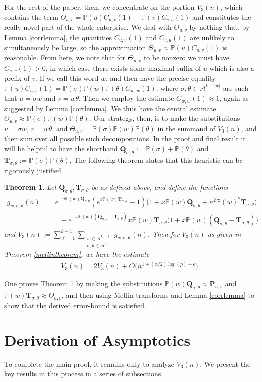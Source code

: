 \documentclass[proceedings]{aofa}
\newtheorem{theorem}{Theorem}
\newcommand{\Tst}{\textbf{T}_{\sigma,\theta}}
\newcommand{\gt}{g_{w,\sigma,\theta}}
\newcommand{\Puv}{\Ps_{u,v}}
\newcommand{\pro}{\mathbb{P}}
\newcommand{\bigo}[1]{O\big(#1\big)}
\newcommand{\A}{\mathcal{A}}
\newcommand{\Thetauv}{\Theta_{u,v}}
\newcommand{\Pu}{\pro(u)}
\newcommand{\Pv}{\pro(v)}
\newcommand{\stdO}{\bigo{n^{ 1+(\alpha/2)\log(p)+\epsilon}}}
\newcommand{\Cuv}{C_{u,v}}
\newcommand{\Cvu}{C_{v,u}}
\newcommand{\Ptheta}{\pro(\theta)}
\newcommand{\Psigma}{\pro(\sigma)}
\newcommand{\Pw}{\pro(w)}
\newcommand{\Qst}{\textbf{Q}_{\sigma,\theta}}
\newcommand{\Ps}{\textbf{P}}
\newcommand{\Vtt}{\widetilde{V}_{3}}
\begin{document}
For the rest of the paper, then, we concentrate on the portion $V_{3}(n)$, which contains the term $\Thetauv=
\Pu\Cuv(1)+\Pv\Cvu(1)$ and constitutes the really novel part of the whole enterprise. We deal with $\Thetauv$ by nothing that, by Lemma \ref{corrlemma}, the quantities $\Cuv(1)$ and $\Cvu(1)$ are unlikely
to simultaneously be large, so the approximation
$\Thetauv \approx \Pu\Cuv(1)$ is reasonable. From here, we note that for $\Thetauv$ to be nonzero we must have $\Cuv(1)>0$, in which case there exists some maximal suffix of $u$ which is also a
prefix of $v$. If we call this word $w$, and then have the precise
equality $\Pu\Cuv(1)=\Psigma \Pw \Ptheta C_{w,w}(1).$ where
$\sigma,\theta \in \A^{k-|w|}$ are such that $u=\sigma w$ and
$v=w\theta$. Then we employ the estimate $C_{w,w}(1) \approx 1$, again as suggested by Lemma \ref{corrlemma}. We thus have the central estimate
$\Thetauv \approx \Psigma \Pw \Ptheta$.
Our strategy, then, is to make the substitutions $u=\sigma w$,
$v=w\theta$, and $\Thetauv = \Psigma\Pw\Ptheta$ in the summand of $V_{3}(n)$, 
and then sum over all possible such decompositions. In the proof and final result it will be  helpful to have the shorthand 
$\Qst := \Psigma + \Ptheta$ and $\Tst := \Psigma\Ptheta$,
The following theorem states that this heuristic can be rigorously justified.
\begin{theorem}\label{thetatheorem}
Let $\Qst,\Tst$ be as defined above, and define the functions
\begin{align*}
\gt(n)&=e^{-n\Pw\Qst}(e^{x\Pw\Tst}-1)\big(1 + x\Pw\Qst + n^{2}\Pw^{2}\Tst)\\
&\qquad{} - e^{-x\Pw(\Qst-\Tst)}x\Pw\Tst\big(1+x\Pw(\Qst-\Tst)\big)
\end{align*}
and
$\Vtt(n):=\sum_{\ell=1}^{k-1}\sum_{\substack{w \in \A^{k-\ell} \\ \sigma,\theta \in \A^{\ell}}}\gt(n)$.
Then for $V_{3}(n)$ as given in Theorem \ref{mellintheorem}, we have the estimate
\begin{align*}
V_{3}(n) = 2\Vtt(n) + \stdO.
\end{align*}
\end{theorem}
One proves Theorem \ref{thetatheorem} by making the substitutions $\Pw \Qst \approx \Puv$ and $\Pw\Tst \approx \Thetauv$, and then using Mellin transforms and Lemma \ref{corrlemma} to show that the derived error-bound is satisfied.


\section{Derivation of Asymptotics}
To complete the main proof, it remains only to analyze $\Vtt(n)$. We present the key results in this process in a series of subsections.
\end{document}
